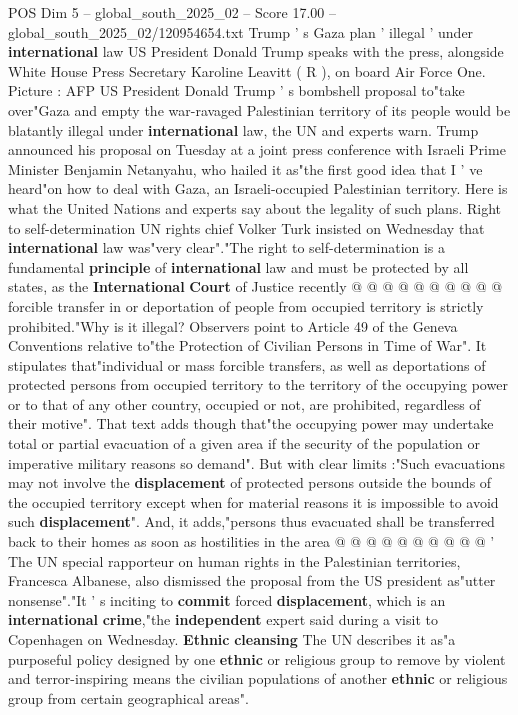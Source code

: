\begin{textsample}{POS Dim 5 – global\_south\_2025\_02 – Score 17.00 – global\_south\_2025\_02/120954654.txt}  \label{ex:f5_pos_143}
Trump ' s Gaza plan ' illegal ' under \textbf{international} law US President Donald Trump speaks with the press, alongside White House Press Secretary Karoline Leavitt ( R ), on board Air Force One.
Picture : AFP US President Donald Trump ' s bombshell proposal to"take over"Gaza and empty the war-ravaged Palestinian territory of its people would be blatantly illegal under \textbf{international} law, the UN and experts warn.
Trump announced his proposal on Tuesday at a joint press conference with Israeli Prime Minister Benjamin Netanyahu, who hailed it as"the first good idea that I ' ve heard"on how to deal with Gaza, an Israeli-occupied Palestinian territory.
Here is what the United Nations and experts say about the legality of such plans.
Right to self-determination UN rights chief Volker Turk insisted on Wednesday that \textbf{international} law was"very clear"."The right to self-determination is a fundamental \textbf{principle} of \textbf{international} law and must be protected by all states, as the \textbf{International} \textbf{Court} of Justice recently @ @ @ @ @ @ @ @ @ @ forcible transfer in or deportation of people from occupied territory is strictly prohibited."Why is it illegal?
Observers point to Article 49 of the Geneva Conventions relative to"the Protection of Civilian Persons in Time of War".
It stipulates that"individual or mass forcible transfers, as well as deportations of protected persons from occupied territory to the territory of the occupying power or to that of any other country, occupied or not, are prohibited, regardless of their motive".
That text adds though that"the occupying power may undertake total or partial evacuation of a given area if the security of the population or imperative military reasons so demand".
But with clear limits :"Such evacuations may not involve the \textbf{displacement} of protected persons outside the bounds of the occupied territory except when for material reasons it is impossible to avoid such \textbf{displacement}".
And, it adds,"persons thus evacuated shall be transferred back to their homes as soon as hostilities in the area @ @ @ @ @ @ @ @ @ @ ' The UN special rapporteur on human rights in the Palestinian territories, Francesca Albanese, also dismissed the proposal from the US president as"utter nonsense"."It ' s inciting to \textbf{commit} forced \textbf{displacement}, which is an \textbf{international} \textbf{crime},"the \textbf{independent} expert said during a visit to Copenhagen on Wednesday. \textbf{Ethnic} \textbf{cleansing} The UN describes it as"a purposeful policy designed by one \textbf{ethnic} or religious group to remove by violent and terror-inspiring means the civilian populations of another \textbf{ethnic} or religious group from certain geographical areas".

\end{textsample}
